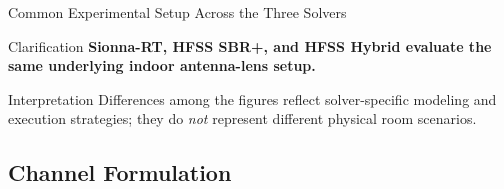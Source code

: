 \begin{frame}[t,shrink=15]{Common Experimental Setup Across the Three Solvers}
    \begin{block}{Clarification}
        \centering
        \textbf{Sionna-RT, HFSS SBR+, and HFSS Hybrid evaluate the same
        underlying indoor antenna-lens setup.}
    \end{block}

    \small

    \vspace{3mm}
    \begin{exampleblock}{Interpretation}
        Differences among the figures reflect solver-specific modeling and
        execution strategies; they do \emph{not} represent different physical
        room scenarios.
    \end{exampleblock}
\end{frame}

\subsection{Channel Formulation}

